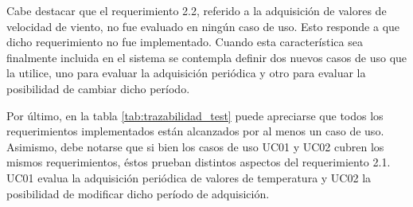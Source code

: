 Cabe destacar que el requerimiento 2.2, referido a la adquisición de valores de velocidad de viento, no fue evaluado en ningún caso de uso.  Esto responde a que dicho requerimiento no fue implementado.  Cuando esta característica sea finalmente incluida en el sistema se contempla definir dos nuevos casos de uso que la utilice, uno para evaluar la adquisición periódica y otro para evaluar la posibilidad de cambiar dicho período.

Por último, en la tabla \ref{tab:trazabilidad_test} puede apreciarse que todos los requerimientos implementados están alcanzados por al menos un caso de uso.  Asimismo, debe notarse que si bien los casos de uso UC01 y UC02 cubren los mismos requerimientos, éstos prueban distintos aspectos del requerimiento 2.1.  UC01 evalua la adquisición periódica de valores de temperatura y UC02 la posibilidad de modificar dicho período de adquisición.